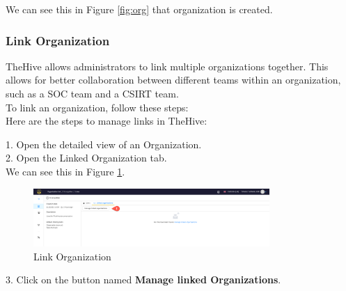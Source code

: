 \documentclass{article}
\begin{document}
We can see this in Figure \ref{fig:org} that organization is created.


\subsubsection{Link Organization}

TheHive allows administrators to link multiple organizations together. This allows for better collaboration between different teams within an organization, such as a SOC team and a CSIRT team.\\
To link an organization, follow these steps: \\

Here are the steps to manage links in TheHive:

1. Open the detailed view of an Organization.\\
2. Open the Linked Organization tab.\\

We can see this in Figure \ref{fig:link}.

\begin{figure}[ht]
    \centering
    \includegraphics[width=0.8\textwidth]{img17.png}
    \caption{Link Organization}
    \label{fig:link}
\end{figure}

3. Click on the button named \textbf{Manage linked Organizations}.\\
\end{document}
